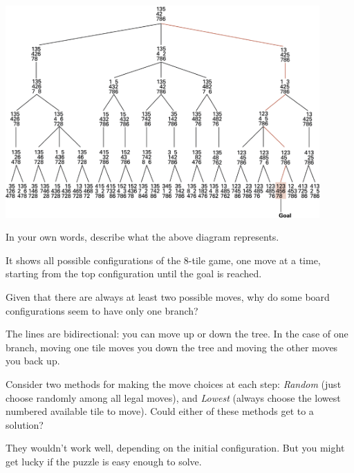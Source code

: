 

\begin{center}
\includegraphics[width=0.9\textwidth]{search-tree1.png}
\end{center}




\Q In your own words, describe what the above diagram represents.

\begin{answer}
It shows all possible configurations of the 8-tile game, one move at a time, starting from the top configuration until the goal is reached.
\end{answer}


\Q Given that there are always at least two possible moves, why do some board configurations seem to have only one branch?

\begin{answer}
The lines are bidirectional: you can move up or down the tree.
In the case of one branch, moving one tile moves you down the tree and moving the other moves you back up.
\end{answer}


\Q \label{guess} Consider two methods for making the move choices at each step:
\emph{Random} (just choose randomly among all legal moves), and
\emph{Lowest} (always choose the lowest numbered available tile to move).
Could either of these methods get to a solution?

\begin{answer}
They wouldn't work well, depending on the initial configuration.
But you might get lucky if the puzzle is easy enough to solve.
\end{answer}


